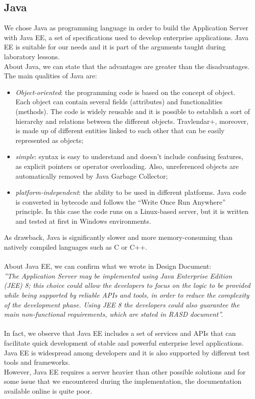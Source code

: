 \subsection{Java}
\label{subsect:Java}
We chose Java as programming language in order to build the Application Server with Java EE, a set of specifications used to develop enterprise applications. Java EE is suitable for our needs and it is part of the arguments taught during laboratory lessons.\\
About Java, we can state that the advantages are greater than the disadvantages. \\
The main qualities of Java are:
\begin{itemize}
\item \textit{Object-oriented}: the programming code is based on the concept of object. Each object can contain several fields (attributes) and functionalities (methods). The code is widely reusable and it is possible to establish a sort of hierarchy and relations between the different objects. Travlendar+, moreover, is made up of different entities linked to each other that can be easily represented as objects;
\item \textit{simple}: syntax is easy to understand and doesn’t include confusing features, as explicit pointers or operator overloading. Also, unreferenced objects are automatically removed by Java Garbage Collector;
\item \textit{platform-independent}: the ability to be used in different platforms. Java code is converted in bytecode and follows the “Write Once Run Anywhere” principle. In this case the code runs on a Linux-based server, but it is written and tested at first in Windows environments. 
\end{itemize}
As drawback, Java is significantly slower and more memory-consuming than natively compiled languages such as C or C++.\\\\
About Java EE, we can confirm what we wrote in Design Document:\\
\textit{''The Application Server may be implemented using Java Enterprise Edition (JEE) 8; this choice could allow the developers to focus on the logic to be provided while being supported by reliable APIs and tools, in order to reduce the complexity of the development phase. Using JEE 8 the developers could also guarantee the main non-functional requirements, which are stated in RASD document''.}\\\\
In fact, we observe that Java EE includes a set of services and APIs that can facilitate quick development of stable and powerful enterprise level applications. Java EE is widespread among developers and it is also supported by different test tools and frameworks.\\
However, Java EE requires a server heavier than other possible solutions and for some issue that we encountered during the implementation, the documentation available online is quite poor. 

